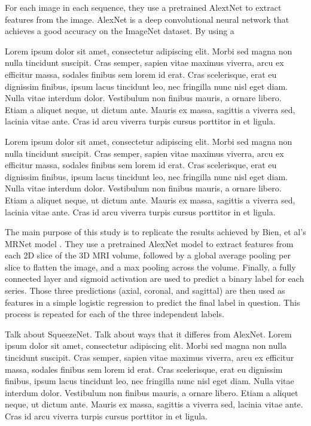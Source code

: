 \documentclass[10pt,twocolumn,letterpaper]{article}
\begin{document}
For each image in each sequence, they use a pretrained AlextNet to extract features from the image. AlexNet is a deep convolutional neural network that achieves a good accuracy on the ImageNet dataset\cite{krizhevsky2012imagenet}. By using a

Lorem ipsum dolor sit amet, consectetur adipiscing elit. Morbi sed magna non nulla tincidunt suscipit. Cras semper, sapien vitae maximus viverra, arcu ex efficitur massa, sodales finibus sem lorem id erat. Cras scelerisque, erat eu dignissim finibus, ipsum lacus tincidunt leo, nec fringilla nunc nisl eget diam. Nulla vitae interdum dolor. Vestibulum non finibus mauris, a ornare libero. Etiam a aliquet neque, ut dictum ante. Mauris ex massa, sagittis a viverra sed, lacinia vitae ante. Cras id arcu viverra turpis cursus porttitor in et ligula.

Lorem ipsum dolor sit amet, consectetur adipiscing elit. Morbi sed magna non nulla tincidunt suscipit. Cras semper, sapien vitae maximus viverra, arcu ex efficitur massa, sodales finibus sem lorem id erat. Cras scelerisque, erat eu dignissim finibus, ipsum lacus tincidunt leo, nec fringilla nunc nisl eget diam. Nulla vitae interdum dolor. Vestibulum non finibus mauris, a ornare libero. Etiam a aliquet neque, ut dictum ante. Mauris ex massa, sagittis a viverra sed, lacinia vitae ante. Cras id arcu viverra turpis cursus porttitor in et ligula.

The main purpose of this study is to replicate the results achieved by Bien, et al's MRNet model \cite{bien2018deep}. They use a pretrained AlexNet \cite{krizhevsky2012imagenet} model to extract features from each 2D slice of the 3D MRI volume, followed by a global average pooling per slice to flatten the image, and a max pooling across the volume. Finally, a fully connected layer and sigmoid activation are used to predict a binary label for each series. Those three predictions (axial, coronal, and sagittal) are then used as features in a simple logistic regression to predict the final label in question. This process is repeated for each of the three independent labels.


Talk about SqueezeNet. Talk about ways that it differes from AlexNet.
Lorem ipsum dolor sit amet, consectetur adipiscing elit. Morbi sed magna non nulla tincidunt suscipit. Cras semper, sapien vitae maximus viverra, arcu ex efficitur massa, sodales finibus sem lorem id erat. Cras scelerisque, erat eu dignissim finibus, ipsum lacus tincidunt leo, nec fringilla nunc nisl eget diam. Nulla vitae interdum dolor. Vestibulum non finibus mauris, a ornare libero. Etiam a aliquet neque, ut dictum ante. Mauris ex massa, sagittis a viverra sed, lacinia vitae ante. Cras id arcu viverra turpis cursus porttitor in et ligula.
\end{document}
